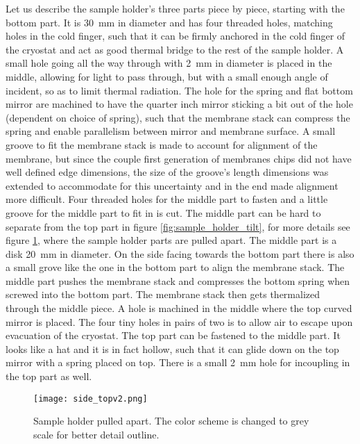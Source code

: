 Let us describe the sample holder's three parts piece by piece, starting with the bottom part. It is \SI{30}{\milli\meter} in diameter and has four threaded holes, matching holes in the cold finger, such that it can be firmly anchored in the cold finger of the cryostat and act as good thermal bridge to the rest of the sample holder. A small hole going all the way through with \SI{2}{\milli\meter} in diameter is placed in the middle, allowing for light to pass through, but with a small enough angle of incident, so as to limit thermal radiation. The hole for the spring and flat bottom mirror are machined to have the quarter inch mirror sticking a bit out of the hole (dependent on choice of spring), such that the membrane stack can compress the spring and enable parallelism between mirror and membrane surface. A small groove to fit the membrane stack is made to account for alignment of the membrane, but since the couple first generation of membranes chips did not have well defined edge dimensions, the size of the groove's length dimensions was extended to accommodate for this uncertainty and in the end made alignment more difficult. Four threaded holes for the middle part to fasten and a little groove for the middle part to fit in is cut. The middle part can be hard to separate from the top part in figure \ref{fig:sample_holder_tilt}, for more details see figure \ref{fig:sample_holder_pull}, where the sample holder parts are pulled apart. The middle part is a disk \SI{20}{\milli\meter} in diameter. On the side facing towards the bottom part there is also a small grove like the one in the bottom part to align the membrane stack. The middle part pushes the membrane stack and compresses the bottom spring when screwed into the bottom part. The membrane stack then gets thermalized through the middle piece. A hole is machined in the middle where the top curved mirror is placed. The four tiny holes in pairs of two is to allow air to escape upon evacuation of the cryostat. The top part can be fastened to the middle part. It looks like a hat and it is in fact hollow, such that it can glide down on the top mirror with a spring placed on top. There is a small \SI{2}{\milli\meter} hole for incoupling in the top part as well.

\begin{figure}[H]
\centering
\texttt{[image: side\_topv2.png]}
\caption{Sample holder pulled apart. The color scheme is changed to grey scale for better detail outline.}
\label{fig:sample_holder_pull}
\end{figure}

